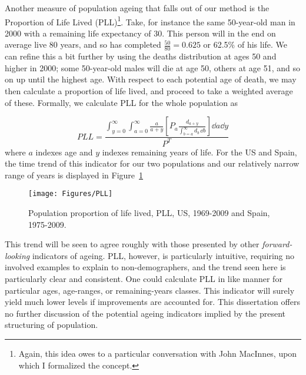 Another measure of population ageing that falls out of our method is the
Proportion of Life Lived (PLL)\footnote{Again, this idea owes to a
particular conversation with John MacInnes, upon which I formalized the
concept.}. Take, for instance the same 50-year-old man in 2000 with a remaining life expectancy of
30. This person will in the end on average live 80 years, and so has completed
$\tfrac{50}{80} = 0.625$ or 62.5\% of his life. We can refine this a bit further
by using the deaths distribution at ages 50 and higher in 2000; some 50-year-old
males will die at age 50, others at age 51, and so on up until the highest age.
With respect to each potential age of death, we may then calculate a proportion
of life lived, and proceed to take a weighted average of these. Formally, we
calculate PLL for the whole population as

\begin{equation}
PLL = \frac{\int _{y = 0} ^\infty \int _{a = 0} ^\infty \frac{a}{a + y}
\left[ P_a
\frac{d_{a + y} }{ \int _{b = a} ^{\infty} d_b\, \dd b  }\right] \dd a \dd y }{
P^T }
\end{equation}
where $a$ indexes age and $y$ indexes remaining years of life. For the US and
Spain, the time trend of this indicator for our two populations and our
relatively narrow range of years is displayed in Figure~\ref{fig:PLL}
\begin{figure}
      \centering
      \caption{Population proportion of life lived, PLL, US, 1969-2009 and
      Spain, 1975-2009.}
         \texttt{[image: Figures/PLL]}
      \label{fig:PLL} 
\end{figure}

This trend will be seen to agree roughly with those presented by other
\textit{forward-looking} indicators of ageing. PLL, however, is particularly
intuitive, requiring no involved examples to explain to non-demographers, and
the trend seen here is particularly clear and consistent. One could
calculate PLL in like manner for particular ages, age-ranges, or remaining-years
classes. This indicator will surely yield much lower levels if improvements
are accounted for. This dissertation offers no further discussion of the
potential ageing indicators implied by the present structuring of population.

